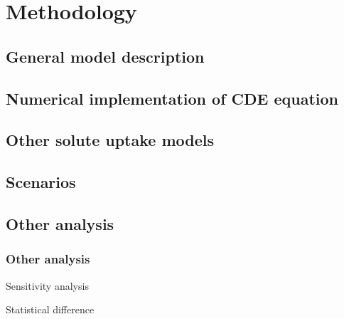 \section{Methodology}
\subsection{General model description}

\subsection{Numerical implementation of CDE equation}
\begin{frame}
\end{frame}

\subsection{Other solute uptake models}
\begin{frame}
\end{frame}

\subsection{Scenarios}
\begin{frame}
\end{frame}

\subsection{Other analysis}
\begin{frame}
\frametitle{Other analysis}
Sensitivity analysis

Statistical difference
\end{frame}

